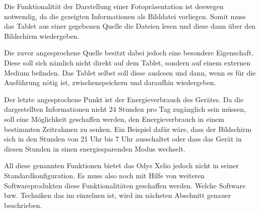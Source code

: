 \begin{flushleft}
Die Funktionalität der Darstellung einer Fotopräsentation ist deswegen notwendig, da die gezeigten Informationen als Bilddatei vorliegen. Somit muss das Tablet aus einer gegebenen Quelle die Dateien lesen und diese dann über den Bildschirm wiedergeben.

Die zuvor angesprochene Quelle besitzt dabei jedoch eine besondere Eigenschaft. Diese soll sich nämlich nicht direkt auf dem Tablet, sondern auf einem externen Medium befinden. Das Tablet selbst soll diese auslesen und dann, wenn es für die Ausführung nötig ist, zwischenspeichern und daraufhin wiedergeben.

Der letzte angesprochene Punkt ist der Energieverbrauch des Gerätes. Da die dargestellten Informationen nicht 24 Stunden pro Tag zugänglich sein müssen, soll eine Möglichkeit geschaffen werden, den Energieverbrauch in einem bestimmten Zeitrahmen zu senken. Ein Beispiel dafür wäre, dass der Bildschirm sich in den Stunden von 21 Uhr bis 7 Uhr ausschaltet oder dass das Gerät in diesen Stunden in einen energiesparenden Modus wechselt. 

All diese genannten Funktionen bietet das Odys Xelio jedoch nicht in seiner Standardkonfiguration. Es muss also noch mit Hilfe von weiteren Softwareprodukten diese Funktionalitäten geschaffen werden. Welche Software bzw. Techniken das im einzelnen ist, wird im nächsten Abschnitt genauer beschrieben. 
\end{flushleft}

% 

